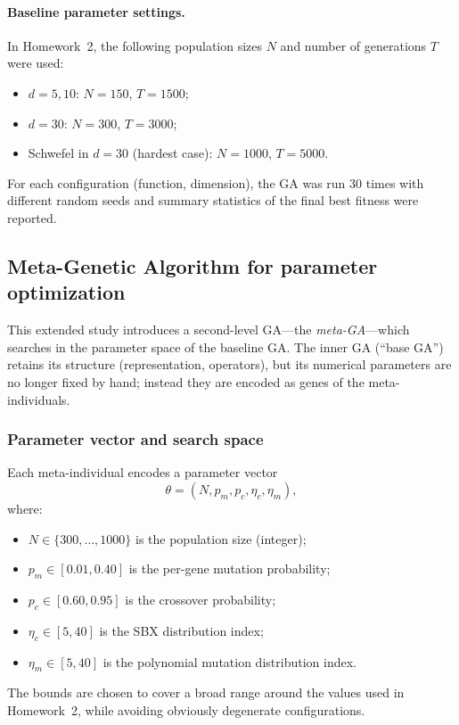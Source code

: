 \documentclass[11pt]{article}
\begin{document}
\paragraph{Baseline parameter settings.}
In Homework~2, the following population sizes $N$ and number of generations $T$
were used:
\begin{itemize}
  \item $d=5,10$: $N = 150$, $T = 1500$;
  \item $d=30$: $N = 300$, $T = 3000$;
  \item Schwefel in $d=30$ (hardest case): $N = 1000$, $T = 5000$.
\end{itemize}
For each configuration (function, dimension), the GA was run 30 times with
different random seeds and summary statistics of the final best fitness were
reported.

\subsection{Meta-Genetic Algorithm for parameter optimization}

This extended study introduces a second-level GA---the \emph{meta-GA}---which
searches in the parameter space of the baseline GA.
The inner GA (``base GA'') retains its structure (representation, operators),
but its numerical parameters are no longer fixed by hand; instead they are
encoded as genes of the meta-individuals.

\subsubsection*{Parameter vector and search space}

Each meta-individual encodes a parameter vector
\[
  \theta = (N, p_m, p_c, \eta_c, \eta_m),
\]
where:
\begin{itemize}
  \item $N \in \{300,\dots,1000\}$ is the population size (integer);
  \item $p_m \in [0.01,0.40]$ is the per-gene mutation probability;
  \item $p_c \in [0.60,0.95]$ is the crossover probability;
  \item $\eta_c \in [5,40]$ is the SBX distribution index;
  \item $\eta_m \in [5,40]$ is the polynomial mutation distribution index.
\end{itemize}
The bounds are chosen to cover a broad range around the values used in
Homework~2, while avoiding obviously degenerate configurations.
\end{document}
